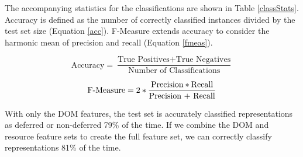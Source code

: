 \documentclass{ipres_proc_article-sp}
\begin{document}
The accompanying statistics for the classifications are shown in Table \ref{classStats}. Accuracy is defined as the number of correctly classified instances divided by the test set size (Equation \ref{acc}). F-Measure extends accuracy to consider the harmonic mean of precision and recall (Equation \ref{fmeas}). 

\begin{equation}
\label{acc}
\text{Accuracy} = \frac{\text{True Positives} + \text{True Negatives}}{\text{Number of Classifications}}
\end{equation}

\begin{equation}
\label{fmeas}
\text{F-Measure} = 2 * \frac{\text{Precision} * \text{Recall}}{\text{\text{Precision} + \text{Recall}}}
\end{equation}

With only the DOM features, the test set is accurately classified representations as deferred or non-deferred 79\% of the time. If we combine the DOM and resource feature sets to create the full feature set, we can correctly classify representations 81\% of the time. %
\end{document}
